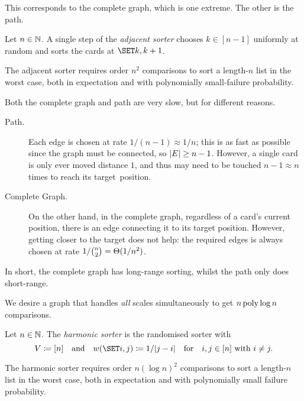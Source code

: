 \documentclass{article}
\begin{document}
This corresponds to the complete graph,
which is one extreme.
The other is the path.

\begin{thm}
Let $n \in \mathbb{N}$.
A single step of the \textit{adjacent sorter} chooses $k \in [n-1]$ uniformly at random and sorts the cards at $\set{k, k+1}$.

The adjacent sorter
requires order $n^2$ comparisons to sort a length-$n$ list in the worst case,
both in expectation and with polynomially small-failure probability.
\end{thm}

Both the complete graph and path are very slow,
but for different reasons.

\begin{description}
	\item [Path.]
	Each edge is chosen at rate $1/(n-1) \approx 1/n$; this is as fast as possible since the graph must be connected, so $| E | \ge n-1$.
	However, a single card is only ever moved distance $1$, and thus may need to be touched $n-1 \approx n$ times to reach its target~position.
	
	\item [Complete Graph.]
	On the other hand, in the complete graph, regardless of a card's current position, there is an edge connecting it to its target position.
	However, getting closer to the target does not help: the required edges is always chosen at rate $1/\binom n2 = \Theta( 1/n^2 )$.
\end{description}

\noindent%
In short, the complete graph has long-range sorting, whilst the path only does short-range.

We desire a graph that handles \emph{all} scales simultaneously to get $n \operatorname{poly}\log n$ comparisons.

\begin{thm}
\label{res:intro:harm}
Let $n \in \mathbb{N}$.
The \textit{harmonic sorter} is the randomised sorter
with
\[
	V
\cq
	[n]
\Qand
	w(\set{i,j})
\cq
	1/\abs{j - i}
\Qfor
	i,j \in [n]
\text{ with }
	i \ne j.
\]

The harmonic sorter
requires order $n (\log n)^2$ comparisons to sort a length-$n$ list in the worst case,
both in expectation and with polynomially small failure probability.
\end{thm}
\end{document}

